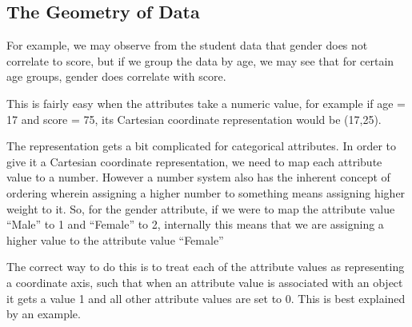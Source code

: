 \documentclass[12pt]{book}\usepackage{knitr}
\begin{document}
\subsection{The Geometry of Data}
\label{sec:GeomOfData}
\begin{HIGHLIGHT}
\par{}
\end{HIGHLIGHT}

\noindent For example, we may observe from the student data that gender does not correlate to score, but if we group the data by age, we may see that for certain age groups, gender does correlate with score. 

\begin{HIGHLIGHT}
\par{}
\end{HIGHLIGHT}

\noindent This is fairly easy when the attributes take a numeric value, for example if age = 17 and score = 75, its Cartesian coordinate representation would be (17,25).  

\noindent The representation gets a bit complicated for categorical attributes. In order to give it a Cartesian coordinate representation, we need to map each attribute value to a number. However a number system also has the inherent concept of ordering wherein assigning a higher number to something means assigning higher weight to it.
So, for the gender attribute, if we were to map the attribute value ``Male'' to 1 
and ``Female'' to 2, internally this means that we are assigning a higher value to the attribute value ``Female''

\noindent The correct way to do this is to treat each of the attribute values as representing a coordinate axis, such that when an attribute value is associated with an object it gets a value 1 and all other attribute values are set to 0. This is best explained by an example.
\end{document}

